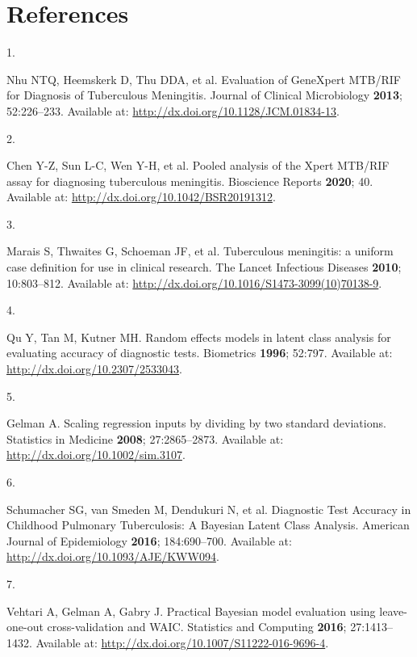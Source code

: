 \documentclass[
  12pt,
]{article}
\newlength{\cslhangindent}
\newlength{\csllabelwidth}
\newlength{\cslentryspacingunit} %
\newenvironment{CSLReferences}[2] %
 {%
  \setlength{\parindent}{0pt}
  \ifodd #1
  \let\oldpar\par
  \def\par{\hangindent=\cslhangindent\oldpar}
  \fi
  \setlength{\parskip}{#2\cslentryspacingunit}
 }%
 {}
\newcommand{\CSLLeftMargin}[1]{\parbox[t]{\csllabelwidth}{#1}}
\newcommand{\CSLRightInline}[1]{\parbox[t]{\linewidth - \csllabelwidth}{#1}\break}
\begin{document}
\hypertarget{references}{%
\section{References}\label{references}}

\hypertarget{refs}{}
\begin{CSLReferences}{0}{0}
\leavevmode{}%
\CSLLeftMargin{1. }
\CSLRightInline{Nhu NTQ, Heemskerk D, Thu DDA, et al. Evaluation of GeneXpert MTB/RIF for Diagnosis of Tuberculous Meningitis. Journal of Clinical Microbiology \textbf{2013}; 52:226--233. Available at: \url{http://dx.doi.org/10.1128/JCM.01834-13}.}

\leavevmode{}%
\CSLLeftMargin{2. }
\CSLRightInline{Chen Y-Z, Sun L-C, Wen Y-H, et al. Pooled analysis of the Xpert MTB/RIF assay for diagnosing tuberculous meningitis. Bioscience Reports \textbf{2020}; 40. Available at: \url{http://dx.doi.org/10.1042/BSR20191312}.}

\leavevmode{}%
\CSLLeftMargin{3. }
\CSLRightInline{Marais S, Thwaites G, Schoeman JF, et al. Tuberculous meningitis: a uniform case definition for use in clinical research. The Lancet Infectious Diseases \textbf{2010}; 10:803--812. Available at: \url{http://dx.doi.org/10.1016/S1473-3099(10)70138-9}.}

\leavevmode{}%
\CSLLeftMargin{4. }
\CSLRightInline{Qu Y, Tan M, Kutner MH. Random effects models in latent class analysis for evaluating accuracy of diagnostic tests. Biometrics \textbf{1996}; 52:797. Available at: \url{http://dx.doi.org/10.2307/2533043}.}

\leavevmode{}%
\CSLLeftMargin{5. }
\CSLRightInline{Gelman A. Scaling regression inputs by dividing by two standard deviations. Statistics in Medicine \textbf{2008}; 27:2865--2873. Available at: \url{http://dx.doi.org/10.1002/sim.3107}.}

\leavevmode{}%
\CSLLeftMargin{6. }
\CSLRightInline{Schumacher SG, van Smeden M, Dendukuri N, et al. Diagnostic Test Accuracy in Childhood Pulmonary Tuberculosis: A Bayesian Latent Class Analysis. American Journal of Epidemiology \textbf{2016}; 184:690--700. Available at: \url{http://dx.doi.org/10.1093/AJE/KWW094}.}

\leavevmode{}%
\CSLLeftMargin{7. }
\CSLRightInline{Vehtari A, Gelman A, Gabry J. Practical Bayesian model evaluation using leave-one-out cross-validation and WAIC. Statistics and Computing \textbf{2016}; 27:1413--1432. Available at: \url{http://dx.doi.org/10.1007/S11222-016-9696-4}.}


\end{CSLReferences}
\end{document}
